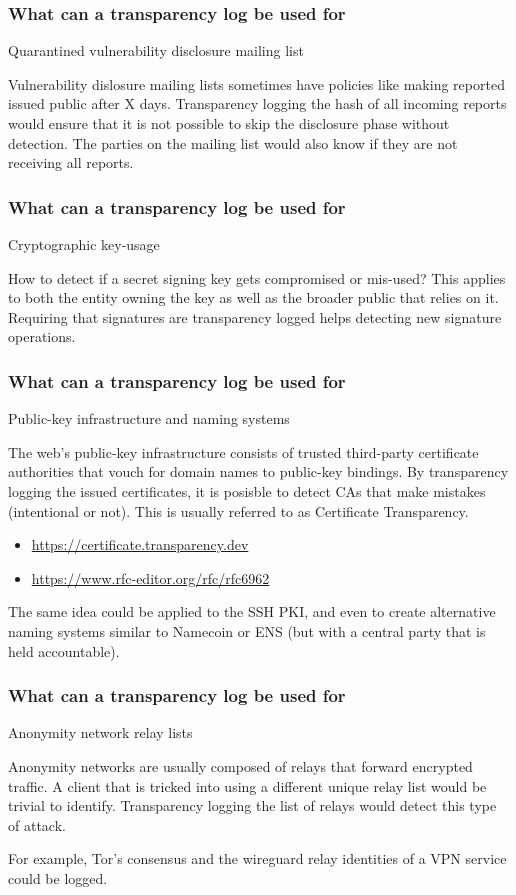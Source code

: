 \begin{frame}
  \frametitle{What can a transparency log be used for}

  Quarantined vulnerability disclosure mailing list
  \pause

  Vulnerability dislosure mailing lists sometimes have policies like
  making reported issued public after X days. Transparency logging the
  hash of all incoming reports would ensure that it is not possible to
  skip the disclosure phase without detection. The parties on the
  mailing list would also know if they are not receiving all reports.
\end{frame}

\begin{frame}
  \frametitle{What can a transparency log be used for}

  Cryptographic key-usage
  \pause

  How to detect if a secret signing key gets compromised or mis-used?
  This applies to both the entity owning the key as well as the
  broader public that relies on it. Requiring that signatures are
  transparency logged helps detecting new signature operations.
\end{frame}

\begin{frame}
  \frametitle{What can a transparency log be used for}

  Public-key infrastructure and naming systems
  \pause

  The web's public-key infrastructure consists of trusted third-party
  certificate authorities that vouch for domain names to public-key
  bindings. By transparency logging the issued certificates, it is
  posisble to detect CAs that make mistakes (intentional or not).
  This is usually referred to as Certificate Transparency.

  \begin{itemize}
  \item \url{https://certificate.transparency.dev}
  \item \url{https://www.rfc-editor.org/rfc/rfc6962}
  \end{itemize}

  \pause

  The same idea could be applied to the SSH PKI, and even to create
  alternative naming systems similar to Namecoin or ENS (but with a
  central party that is held accountable).
\end{frame}

\begin{frame}
  \frametitle{What can a transparency log be used for}

  Anonymity network relay lists
  \pause

  Anonymity networks are usually composed of relays that forward
  encrypted traffic. A client that is tricked into using a different
  unique relay list would be trivial to identify. Transparency
  logging the list of relays would detect this type of attack.

  For example, Tor's consensus and the wireguard relay identities of a
  VPN service could be logged.
\end{frame}

